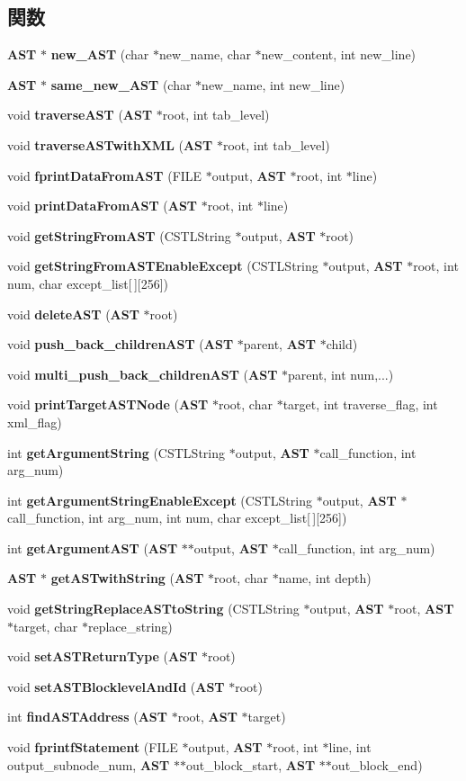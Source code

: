 \subsection*{関数}
\begin{DoxyCompactItemize}
\item 
{\bf AST} $\ast$ {\bf new\_\-AST} (char $\ast$new\_\-name, char $\ast$new\_\-content, int new\_\-line)
\item 
{\bf AST} $\ast$ {\bf same\_\-new\_\-AST} (char $\ast$new\_\-name, int new\_\-line)
\item 
void {\bf traverseAST} ({\bf AST} $\ast$root, int tab\_\-level)
\item 
void {\bf traverseASTwithXML} ({\bf AST} $\ast$root, int tab\_\-level)
\item 
void {\bf fprintDataFromAST} (FILE $\ast$output, {\bf AST} $\ast$root, int $\ast$line)
\item 
void {\bf printDataFromAST} ({\bf AST} $\ast$root, int $\ast$line)
\item 
void {\bf getStringFromAST} (CSTLString $\ast$output, {\bf AST} $\ast$root)
\item 
void {\bf getStringFromASTEnableExcept} (CSTLString $\ast$output, {\bf AST} $\ast$root, int num, char except\_\-list[$\,$][256])
\item 
void {\bf deleteAST} ({\bf AST} $\ast$root)
\item 
void {\bf push\_\-back\_\-childrenAST} ({\bf AST} $\ast$parent, {\bf AST} $\ast$child)
\item 
void {\bf multi\_\-push\_\-back\_\-childrenAST} ({\bf AST} $\ast$parent, int num,...)
\item 
void {\bf printTargetASTNode} ({\bf AST} $\ast$root, char $\ast$target, int traverse\_\-flag, int xml\_\-flag)
\item 
int {\bf getArgumentString} (CSTLString $\ast$output, {\bf AST} $\ast$call\_\-function, int arg\_\-num)
\item 
int {\bf getArgumentStringEnableExcept} (CSTLString $\ast$output, {\bf AST} $\ast$call\_\-function, int arg\_\-num, int num, char except\_\-list[$\,$][256])
\item 
int {\bf getArgumentAST} ({\bf AST} $\ast$$\ast$output, {\bf AST} $\ast$call\_\-function, int arg\_\-num)
\item 
{\bf AST} $\ast$ {\bf getASTwithString} ({\bf AST} $\ast$root, char $\ast$name, int depth)
\item 
void {\bf getStringReplaceASTtoString} (CSTLString $\ast$output, {\bf AST} $\ast$root, {\bf AST} $\ast$target, char $\ast$replace\_\-string)
\item 
void {\bf setASTReturnType} ({\bf AST} $\ast$root)
\item 
void {\bf setASTBlocklevelAndId} ({\bf AST} $\ast$root)
\item 
int {\bf findASTAddress} ({\bf AST} $\ast$root, {\bf AST} $\ast$target)
\item 
void {\bf fprintfStatement} (FILE $\ast$output, {\bf AST} $\ast$root, int $\ast$line, int output\_\-subnode\_\-num, {\bf AST} $\ast$$\ast$out\_\-block\_\-start, {\bf AST} $\ast$$\ast$out\_\-block\_\-end)
\end{DoxyCompactItemize}


